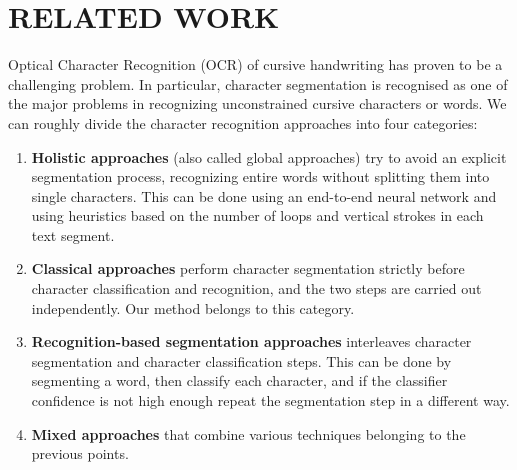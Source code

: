 \section{RELATED WORK}
\label{sec:relatedwork}

Optical Character Recognition (OCR) of cursive handwriting has proven to be a challenging problem. In particular, character segmentation is recognised as one of the major problems in recognizing unconstrained cursive characters or words. We can roughly divide the character recognition approaches into four categories:
\begin{enumerate}
	\item \textbf{Holistic approaches} (also called global approaches) try to avoid an explicit segmentation process, recognizing entire words without splitting them into single characters. This can be done using an end-to-end neural network and using heuristics based on the number of loops and vertical strokes in each text segment.
	\item \textbf{Classical approaches} perform character segmentation strictly before character classification and recognition, and the two steps are carried out independently. Our method belongs to this category.
	\item \textbf{Recognition-based segmentation approaches} interleaves character segmentation and character classification steps. This can be done by segmenting a word, then classify each character, and if the classifier confidence is not high enough repeat the segmentation step in a different way.
	\item \textbf{Mixed approaches} that combine various techniques belonging to the previous points.
\end{enumerate}

